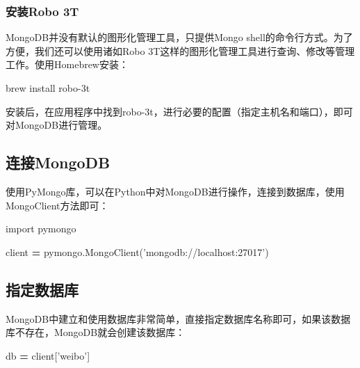 \documentclass[]{ctexbook}
\newenvironment{Shaded}{\begin{snugshade}}{\end{snugshade}}
\newcommand{\ExtensionTok}[1]{#1}
\newcommand{\ImportTok}[1]{#1}
\newcommand{\NormalTok}[1]{#1}
\newcommand{\OperatorTok}[1]{\textcolor[rgb]{0.81,0.36,0.00}{\textbf{#1}}}
\newcommand{\StringTok}[1]{\textcolor[rgb]{0.31,0.60,0.02}{#1}}
\begin{document}
\hypertarget{ux5b89ux88c5robo-3t}{%
\subsubsection{安装Robo 3T}\label{ux5b89ux88c5robo-3t}}

MongoDB并没有默认的图形化管理工具，只提供Mongo shell的命令行方式。为了方便，我们还可以使用诸如Robo 3T这样的图形化管理工具进行查询、修改等管理工作。使用Homebrew安装：

\begin{Shaded}
\begin{Highlighting}[]
\ExtensionTok{brew}\NormalTok{ install robo-3t}
\end{Highlighting}
\end{Shaded}

安装后，在应用程序中找到robo-3t，进行必要的配置（指定主机名和端口），即可对MongoDB进行管理。

\hypertarget{ux8fdeux63a5mongodb}{%
\subsection{连接MongoDB}\label{ux8fdeux63a5mongodb}}

使用PyMongo库，可以在Python中对MongoDB进行操作，连接到数据库，使用MongoClient方法即可：

\begin{Shaded}
\begin{Highlighting}[]
\ImportTok{import}\NormalTok{ pymongo}

\NormalTok{client }\OperatorTok{=}\NormalTok{ pymongo.MongoClient(}\StringTok{'mongodb://localhost:27017'}\NormalTok{)}
\end{Highlighting}
\end{Shaded}

\hypertarget{ux6307ux5b9aux6570ux636eux5e93}{%
\subsection{指定数据库}\label{ux6307ux5b9aux6570ux636eux5e93}}

MongoDB中建立和使用数据库非常简单，直接指定数据库名称即可，如果该数据库不存在，MongoDB就会创建该数据库：

\begin{Shaded}
\begin{Highlighting}[]
\NormalTok{db }\OperatorTok{=}\NormalTok{ client[}\StringTok{'weibo'}\NormalTok{]}
\end{Highlighting}
\end{Shaded}
\end{document}
